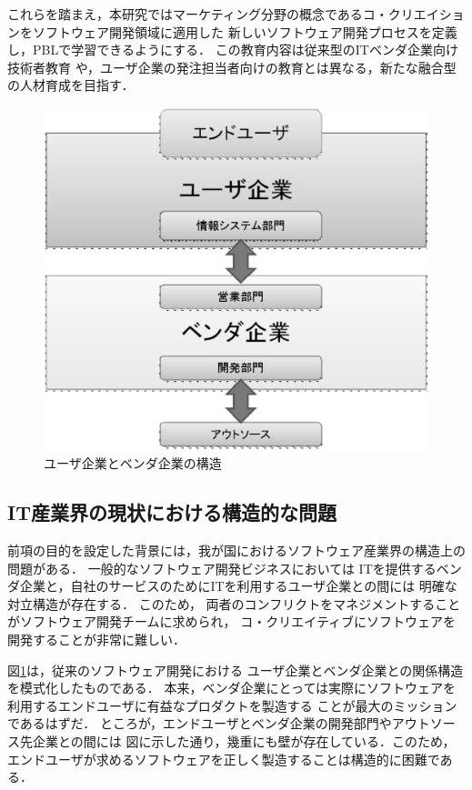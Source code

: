 \documentclass[a4j,9pt,twoside,twocolumn]{jsarticle}
\begin{document}
    これらを踏まえ，本研究ではマーケティング分野の概念であるコ・クリエイションをソフトウェア開発領域に適用した
    新しいソフトウェア開発プロセスを定義し，PBLで学習できるようにする．
    この教育内容は従来型のITベンダ企業向け技術者教育
    や，ユーザ企業の発注担当者向けの教育とは異なる，新たな融合型の人材育成を目指す．
    
\begin{figure}
\begin{center}
\includegraphics[width=\linewidth]{figs/user_vendor_model.eps}
\caption{ユーザ企業とベンダ企業の構造}
\label{fig:user_vendor_model}
\end{center}
\end{figure}
	
\subsection{IT産業界の現状における構造的な問題}
    前項の目的を設定した背景には，我が国におけるソフトウェア産業界の構造上の問題がある．
	一般的なソフトウェア開発ビジネスにおいては    
    ITを提供するベンダ企業と，自社のサービスのためにITを利用するユーザ企業との間には
    明確な対立構造が存在する．
    このため，
    両者のコンフリクトをマネジメントすることがソフトウェア開発チームに求められ，
    コ・クリエイティブにソフトウェアを開発することが非常に難しい．
    
    図\ref{fig:user_vendor_model}は，従来のソフトウェア開発における
    ユーザ企業とベンダ企業との関係構造を模式化したものである．
    本来，ベンダ企業にとっては実際にソフトウェアを利用するエンドユーザに有益なプロダクトを製造する
    ことが最大のミッションであるはずだ．
    ところが，エンドユーザとベンダ企業の開発部門やアウトソース先企業との間には
    図に示した通り，幾重にも壁が存在している．このため，
    エンドユーザが求めるソフトウェアを正しく製造することは構造的に困難である．
    
\end{document}
